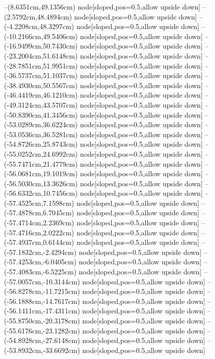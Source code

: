--(8.6351cm,49.1356cm) node[sloped,pos=0.5,allow upside down]{\ArrowIn}
--(2.5792cm,48.4894cm) node[sloped,pos=0.5,allow upside down]{\ArrowIn}
--(-4.2208cm,48.3297cm) node[sloped,pos=0.5,allow upside down]{\ArrowIn}
--(-10.2166cm,49.5406cm) node[sloped,pos=0.5,allow upside down]{\ArrowIn}
--(-16.9499cm,50.7430cm) node[sloped,pos=0.5,allow upside down]{\ArrowIn}
--(-23.2004cm,51.6148cm) node[sloped,pos=0.5,allow upside down]{\ArrowIn}
--(-28.7851cm,51.9951cm) node[sloped,pos=0.5,allow upside down]{\ArrowIn}
--(-36.5737cm,51.1037cm) node[sloped,pos=0.5,allow upside down]{\ArrowIn}
--(-38.4930cm,50.5567cm) node[sloped,pos=0.5,allow upside down]{\ArrowIn}
--(-46.4419cm,46.1210cm) node[sloped,pos=0.5,allow upside down]{\ArrowIn}
--(-49.3124cm,43.5707cm) node[sloped,pos=0.5,allow upside down]{\ArrowIn}
--(-50.8390cm,41.3456cm) node[sloped,pos=0.5,allow upside down]{\ArrowIn}
--(-53.0289cm,36.6224cm) node[sloped,pos=0.5,allow upside down]{\ArrowIn}
--(-53.0536cm,36.5281cm) node[sloped,pos=0.5,allow upside down]{\arrowIn}
--(-54.8726cm,25.8743cm) node[sloped,pos=0.5,allow upside down]{\ArrowIn}
--(-55.0252cm,24.6992cm) node[sloped,pos=0.5,allow upside down]{\ArrowIn}
--(-55.7471cm,21.4779cm) node[sloped,pos=0.5,allow upside down]{\ArrowIn}
--(-56.0681cm,19.1019cm) node[sloped,pos=0.5,allow upside down]{\ArrowIn}
--(-56.5030cm,13.3626cm) node[sloped,pos=0.5,allow upside down]{\ArrowIn}
--(-56.6332cm,10.7456cm) node[sloped,pos=0.5,allow upside down]{\ArrowIn}
--(-57.4525cm,7.1598cm) node[sloped,pos=0.5,allow upside down]{\ArrowIn}
--(-57.4878cm,6.7045cm) node[sloped,pos=0.5,allow upside down]{\arrowIn}
--(-57.4714cm,2.2369cm) node[sloped,pos=0.5,allow upside down]{\ArrowIn}
--(-57.4716cm,2.0222cm) node[sloped,pos=0.5,allow upside down]{\arrowIn}
--(-57.4937cm,0.6144cm) node[sloped,pos=0.5,allow upside down]{\ArrowIn}
--(-57.1832cm,-2.4294cm) node[sloped,pos=0.5,allow upside down]{\ArrowIn}
--(-57.4253cm,-6.0405cm) node[sloped,pos=0.5,allow upside down]{\ArrowIn}
--(-57.4083cm,-6.5225cm) node[sloped,pos=0.5,allow upside down]{\arrowIn}
--(-57.0057cm,-10.3144cm) node[sloped,pos=0.5,allow upside down]{\ArrowIn}
--(-56.8278cm,-11.7215cm) node[sloped,pos=0.5,allow upside down]{\ArrowIn}
--(-56.1888cm,-14.7617cm) node[sloped,pos=0.5,allow upside down]{\ArrowIn}
--(-56.1411cm,-17.4311cm) node[sloped,pos=0.5,allow upside down]{\ArrowIn}
--(-55.8750cm,-20.3178cm) node[sloped,pos=0.5,allow upside down]{\ArrowIn}
--(-55.6176cm,-23.1282cm) node[sloped,pos=0.5,allow upside down]{\ArrowIn}
--(-54.8928cm,-27.6148cm) node[sloped,pos=0.5,allow upside down]{\ArrowIn}
--(-53.8932cm,-33.6692cm) node[sloped,pos=0.5,allow upside down]{\ArrowIn}
